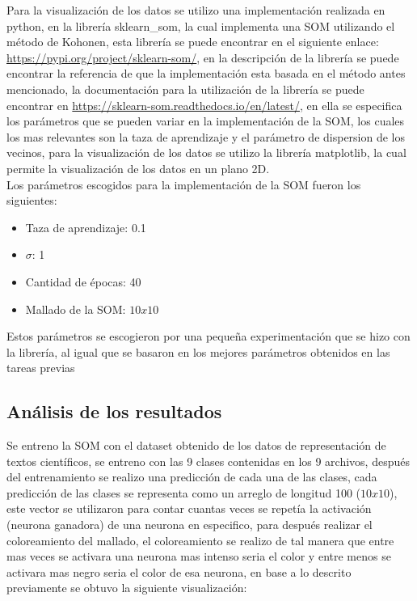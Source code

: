 \documentclass{article}
\theoremstyle{mytheoremstyle}
\theoremstyle{mytheoremstyle}
\theoremstyle{myproblemstyle}
\begin{document}
Para la visualización de los datos se utilizo una implementación realizada en python, en la librería sklearn\_som, la cual implementa una SOM utilizando el método de Kohonen, esta librería se puede encontrar en el siguiente enlace: \url{https://pypi.org/project/sklearn-som/}, en la descripción de la librería se puede encontrar la referencia de que la implementación esta basada en el método antes mencionado, la documentación para la utilización de la librería se puede encontrar en \url{https://sklearn-som.readthedocs.io/en/latest/}, en ella se especifica los parámetros que se pueden variar en la implementación de la SOM, los cuales los mas relevantes son la taza de aprendizaje y el parámetro de dispersion de los vecinos, para la visualización de los datos se utilizo la librería matplotlib, la cual permite la visualización de los datos en un plano 2D.
\\

Los parámetros escogidos para la implementación de la SOM fueron los siguientes:

\begin{itemize}
  \item Taza de aprendizaje: 0.1
  \item $\sigma$: 1
  \item Cantidad de épocas: 40
  \item Mallado de la SOM: $10x10$
\end{itemize}

Estos parámetros se escogieron por una pequeña experimentación que se hizo con la librería, al igual que se basaron en los mejores parámetros obtenidos en las tareas previas

\subsection*{Análisis de los resultados}

Se entreno la SOM con el dataset obtenido de los datos de representación de textos científicos, se entreno con las 9 clases contenidas en los 9 archivos, después del entrenamiento se realizo una predicción de cada una de las clases, cada predicción de las clases se representa como un arreglo de longitud 100 ($10x10$), este vector se utilizaron para contar cuantas veces se repetía la activación (neurona ganadora) de una neurona en especifico, para después realizar el coloreamiento del mallado, el coloreamiento se realizo de tal manera que entre mas veces se activara una neurona mas intenso seria el color y entre menos se activara mas negro seria el color de esa neurona, en base a lo descrito previamente se obtuvo la siguiente visualización:
\end{document}
